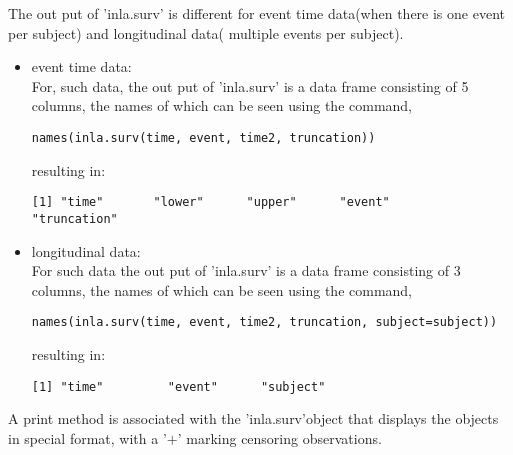 \documentclass[a4paper,11pt]{article}
\begin{document}
The out put of 'inla.surv' is different for event time data(when there is one event per subject) and longitudinal data( multiple events per subject).
\begin{itemize}
\item event time data:\\
For,  such data, the out put of 'inla.surv' is a data frame consisting of 5 columns, the names of which can be seen using the command,
\small
\begin{verbatim}
names(inla.surv(time, event, time2, truncation))
\end{verbatim}
\small
resulting in:
\small
\begin{verbatim}
[1] "time"       "lower"      "upper"      "event"      "truncation"
\end{verbatim}
\small
\item longitudinal data: \\
For such data the out put of 'inla.surv' is a data frame consisting of 3 columns, the names of which can be seen using the command,
\small
\begin{verbatim}
names(inla.surv(time, event, time2, truncation, subject=subject))
\end{verbatim}
\small
resulting in:
\small
\begin{verbatim}
[1] "time"         "event"      "subject"
\end{verbatim}
\small
\end{itemize}
A print method is associated with the 'inla.surv'object that displays the objects in special format, with a '$+$' marking censoring observations. 
\end{document}
